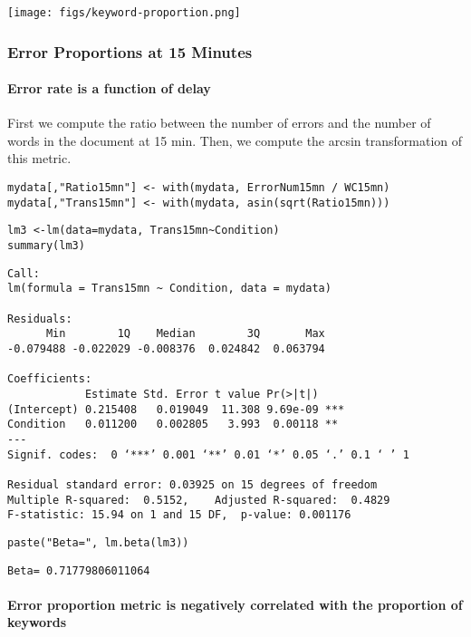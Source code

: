 \documentclass[10pt]{article}
\begin{document}
\texttt{[image: figs/keyword-proportion.png]}




\subsubsection{Error Proportions at 15 Minutes}
\label{sec-2-2-2}

\paragraph*{Error rate is a function of delay}
\label{sec-2-2-2-1}

First we compute the ratio between the number of errors and the number
of words in the document at 15 min. Then, we compute the arcsin
transformation of this metric.

\begin{verbatim}
mydata[,"Ratio15mn"] <- with(mydata, ErrorNum15mn / WC15mn)
mydata[,"Trans15mn"] <- with(mydata, asin(sqrt(Ratio15mn)))
\end{verbatim}

\begin{verbatim}
lm3 <-lm(data=mydata, Trans15mn~Condition)
summary(lm3)
\end{verbatim}

\begin{verbatim}
Call:
lm(formula = Trans15mn ~ Condition, data = mydata)

Residuals:
      Min        1Q    Median        3Q       Max 
-0.079488 -0.022029 -0.008376  0.024842  0.063794 

Coefficients:
            Estimate Std. Error t value Pr(>|t|)    
(Intercept) 0.215408   0.019049  11.308 9.69e-09 ***
Condition   0.011200   0.002805   3.993  0.00118 ** 
---
Signif. codes:  0 ‘***’ 0.001 ‘**’ 0.01 ‘*’ 0.05 ‘.’ 0.1 ‘ ’ 1

Residual standard error: 0.03925 on 15 degrees of freedom
Multiple R-squared:  0.5152,	Adjusted R-squared:  0.4829 
F-statistic: 15.94 on 1 and 15 DF,  p-value: 0.001176
\end{verbatim}

\begin{verbatim}
paste("Beta=", lm.beta(lm3))
\end{verbatim}

\begin{verbatim}
Beta= 0.71779806011064
\end{verbatim}


\paragraph*{Error proportion metric is negatively correlated with the proportion of keywords}
\label{sec-2-2-2-2}
\end{document}
